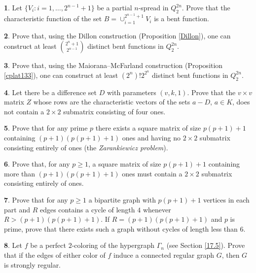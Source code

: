 \documentclass[11pt]{article}
\theoremstyle{definition}
\newtheorem{exercise}{\quad}
\begin{document}
{{{\begin{exercise}
Let $\{V_i : i=1,\dots,2^{n-1}+1\}$ be a partial $n$-spread in
$Q_2^{2n}$. Prove that the characteristic function of the set
$B=\cup_{i=1}^{2^{n-1}+1}V_i$ is a bent function.
\end{exercise}

\begin{exercise}
Prove that, using the Dillon construction (Proposition
\ref{Dillon}), one can construct at least ${2^n+1 \choose 2^{n-1}}$  distinct bent functions in $Q^{2n}_2$.
\end{exercise}

\begin{exercise}
Prove that, using the Maiorana--McFarland construction
(Proposition \ref{cplat133}), one can construct at least
$(2^n)!2^{2^n}$ distinct bent functions in $Q^{2n}_2$.
\end{exercise}

\begin{exercise}
Let there be a difference set $D$ with parameters $(v,k,1)$.
Prove that the $v\times v$ matrix $Z$ whose rows
are the characteristic vectors of the sets $a-D$, $a\in K$, does
not contain a $2\times 2$ submatrix consisting of four ones.
\end{exercise}

\begin{exercise}
Prove that for any prime $p$ there exists a square matrix
of size $p(p+1)+1$ containing $(p+1)(p(p+1)+1)$ ones and having
no $2\times 2$ submatrix consisting entirely of  ones  (the
{\sl Zarankiewicz problem}).
\end{exercise}

\begin{exercise}
Prove that, for any $p\ge 1$, a square matrix of size
$p(p+1)+1$ containing
more than $(p+1)(p(p+1)+1)$ ones must contain a $2\times 2$
submatrix consisting  entirely of  ones.
\end{exercise}

\begin{exercise}
Prove that for any $p\ge 1$ a bipartite graph with
$p(p+1)+1$ vertices in each part and $R$ edges contains a cycle of length $4$
whenever $R>(p+1)(p(p+1)+1)$. If $R=(p+1)(p(p+1)+1)$ and $p$ is
prime, prove that there exists such a graph without cycles of length less than $6$.
\end{exercise}

\begin{exercise}
Let $f$ be a perfect $2$-coloring of the hypergraph
$\Gamma_n$ (see Section \ref{17.5}).
Prove that if the edges of either color of $f$ induce a
connected regular graph $G$, then $G$ is strongly regular.
\end{exercise}















}}}
\end{document}
